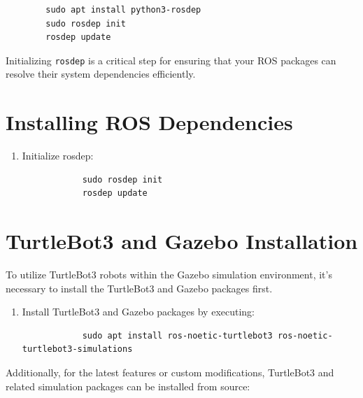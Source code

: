 \documentclass[12pt,a4paper]{article}
\begin{document}
	\begin{verbatim}
		sudo apt install python3-rosdep
		sudo rosdep init
		rosdep update
	\end{verbatim}
	Initializing \texttt{rosdep} is a critical step for ensuring that your ROS packages can resolve their system dependencies efficiently.
	
	
	\section{Installing ROS Dependencies}
	\begin{enumerate}
		\item Initialize rosdep:
		\begin{verbatim}
			sudo rosdep init
			rosdep update
		\end{verbatim}
	\end{enumerate}
	
	\section{TurtleBot3 and Gazebo Installation}
	To utilize TurtleBot3 robots within the Gazebo simulation environment, it's necessary to install the TurtleBot3 and Gazebo packages first.
	
	\begin{enumerate}
		\item Install TurtleBot3 and Gazebo packages by executing:
		\begin{verbatim}
			sudo apt install ros-noetic-turtlebot3 ros-noetic-turtlebot3-simulations
		\end{verbatim}
	\end{enumerate}
	
	Additionally, for the latest features or custom modifications, TurtleBot3 and related simulation packages can be installed from source:
	
\end{document}
